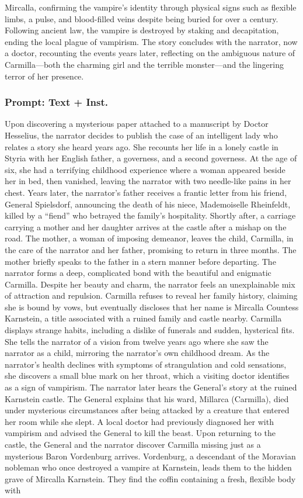 \documentclass{article} %
\begin{document}
Mircalla, confirming the vampire's identity through physical signs such as flexible limbs, a pulse, and blood-filled veins despite being buried for over a century. Following ancient law, the vampire is destroyed by staking and decapitation, ending the local plague of vampirism. The story concludes with the narrator, now a doctor, recounting the events years later, reflecting on the ambiguous nature of Carmilla—both the charming girl and the terrible monster—and the lingering terror of her presence.

\subsubsection{Prompt: Text + Inst.}

Upon discovering a mysterious paper attached to a manuscript by Doctor Hesselius, the narrator decides to publish the case of an intelligent lady who relates a story she heard years ago. She recounts her life in a lonely castle in Styria with her English father, a governess, and a second governess. At the age of six, she had a terrifying childhood experience where a woman appeared beside her in bed, then vanished, leaving the narrator with two needle-like pains in her chest. Years later, the narrator's father receives a frantic letter from his friend, General Spielsdorf, announcing the death of his niece, Mademoiselle Rheinfeldt, killed by a ``fiend'' who betrayed the family's hospitality. Shortly after, a carriage carrying a mother and her daughter arrives at the castle after a mishap on the road. The mother, a woman of imposing demeanor, leaves the child, Carmilla, in the care of the narrator and her father, promising to return in three months. The mother briefly speaks to the father in a stern manner before departing. The narrator forms a deep, complicated bond with the beautiful and enigmatic Carmilla. Despite her beauty and charm, the narrator feels an unexplainable mix of attraction and repulsion. Carmilla refuses to reveal her family history, claiming she is bound by vows, but eventually discloses that her name is Mircalla Countess Karnstein, a title associated with a ruined family and castle nearby. Carmilla displays strange habits, including a dislike of funerals and sudden, hysterical fits. She tells the narrator of a vision from twelve years ago where she saw the narrator as a child, mirroring the narrator's own childhood dream. As the narrator's health declines with symptoms of strangulation and cold sensations, she discovers a small blue mark on her throat, which a visiting doctor identifies as a sign of vampirism. The narrator later hears the General's story at the ruined Karnstein castle. The General explains that his ward, Millarca (Carmilla), died under mysterious circumstances after being attacked by a creature that entered her room while she slept. A local doctor had previously diagnosed her with vampirism and advised the General to kill the beast. Upon returning to the castle, the General and the narrator discover Carmilla missing just as a mysterious Baron Vordenburg arrives. Vordenburg, a descendant of the Moravian nobleman who once destroyed a vampire at Karnstein, leads them to the hidden grave of Mircalla Karnstein. They find the coffin containing a fresh, flexible body with 
\end{document}
